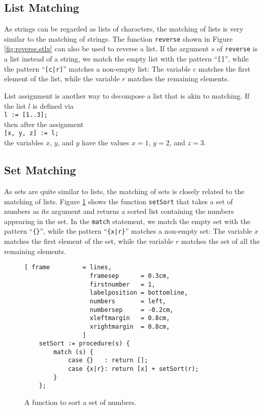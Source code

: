 \subsection{List Matching}
As strings can be regarded as lists of characters, the matching of lists is very similar to the matching of
strings.  The function \texttt{reverse} shown in Figure \ref{fig:reverse.stlx} can also be used to
reverse a list.
 If the argument $s$ of \texttt{reverse} is a list instead of a string, we match the empty list with
 the pattern ``\texttt{[]}'', while the pattern ``\texttt{[c|r]}'' matches a non-empty list:  
The variable $c$  matches the first element  of the list, while the variable $r$ matches the remaining elements.

List assignment is another way to decompose a list that is akin to matching.  If the list 
$l$ is defined via
\\[0.2cm]
\hspace*{1.3cm}
\texttt{l := [1..3];}
\\[0.2cm]
then after the assignment
\\[0.2cm]
\hspace*{1.3cm}
\texttt{[x, y, z] := l;}
\\[0.2cm]
the variables $x$, $y$, and $y$ have the values $x = 1$, $y = 2$, and $z = 3$.

\subsection{Set Matching}
As sets are quite similar to lists, the matching of sets is closely related to the matching of
lists.  Figure \ref{fig:set-sort.stlx}  shows the function \texttt{setSort} that takes a
set of numbers as its  argument and returns a sorted list containing the numbers appearing
in the set.  In the \texttt{match} statement, we match the empty set with the pattern
``\texttt{\{\}}'', while the pattern ``\texttt{\{x|r\}}'' matches a non-empty set:  
The variable $x$ matches the first element of the set, while the variable $r$ matches the
set of all the remaining elements.  


\begin{figure}[!ht]
\centering
\begin{Verbatim}[ frame         = lines, 
                  framesep      = 0.3cm, 
                  firstnumber   = 1,
                  labelposition = bottomline,
                  numbers       = left,
                  numbersep     = -0.2cm,
                  xleftmargin   = 0.8cm,
                  xrightmargin  = 0.8cm,
                ]
    setSort := procedure(s) {
        match (s) {
            case {}   : return [];
            case {x|r}: return [x] + setSort(r);
        }
    };
\end{Verbatim}
\vspace*{-0.3cm}
\caption{A function to sort a set of numbers.}
\label{fig:set-sort.stlx}
\end{figure}

